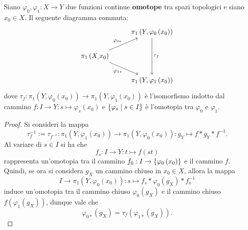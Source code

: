\documentclass[]{article}
\begin{document}
\begin{lemma} \nl
    Siano $\varphi_0, \varphi_1: X \to Y$ due funzioni continue \textbf{omotope} tra spazi topologici e siano $x_0 \in X$. \nl
    Il seguente diagramma commuta:
    \[
        \begin{tikzcd}
        & {\pi_1\left(Y,\varphi_0\left(x_0\right)\right)} \\
        {\pi_1\left(X_,x_0\right)} \\
        & {\pi_1\left(Y,\varphi_1\left(x_0\right)\right)}
        \arrow["{\tau_f}", from=1-2, to=3-2]
        \arrow["{\varphi_{0*}}", from=2-1, to=1-2]
        \arrow["{\varphi_{1*}}"', from=2-1, to=3-2]
        \end{tikzcd}
    \]
    dove $\tau_f: \pi_1\left(Y, \varphi_0\left(x_0\right)\right) \to \pi_1\left(Y, \varphi_1\left(x_0\right)\right)$ è l'isomorfismo indotto dal cammino
    $f: I \to Y: s \mapsto \varphi_s\left(x_0\right)$ e $\left\{ \varphi_s \mid s \in I \right\}$ \`e l'omotopia tra $\varphi_0$ e $\varphi_1$.
\end{lemma}

\begin{proof} \nl
    Si consideri la mappa
    \[
        \tau^{-1}_f := \tau_{f^{-1}}: \pi_1\left(Y, \varphi_1\left(x_0\right)\right) \to \pi_1\left(Y, \varphi_0\left(x_0\right)\right): g_Y \mapsto f * g_Y * f^{-1}.
    \]
    Al variare di $s \in I$ si ha che
    \[
        f_s: I \to Y: t \mapsto f\left(st\right)
    \]
   rappresenta un'omotopia tra il cammino $f_0: I \to \left\{ \varphi_0\left(x_0\right) \right\}$ 
   e il cammino $f$. \nl
   Quindi, se ora si considera $g_X$ un cammino chiuso in $x_0 \in X$, allora la mappa
   \[
        I \to \pi_1\left(Y, \varphi_0\left(x_0\right)\right): s \mapsto f_s * \varphi_{0}\left(g_X\right) * f_s^{-1}
   \]
   induce un'omotopia tra il cammino chiuso $\varphi_{0}\left(g_X\right)$ e il cammino chiuso
    $f\left(\varphi_{1}\left(g_X\right)\right)$, dunque vale  che
    \[
        \varphi_{0*}\left(g_X\right) = \tau_f\left(\varphi_{1*}\left(g_X\right)\right).
    \]
\end{proof}
\end{document}
